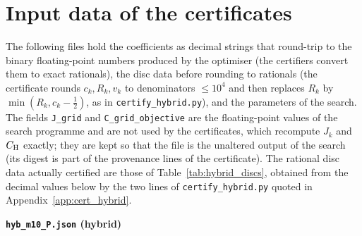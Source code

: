 \documentclass[11pt,reqno]{amsart}
\numberwithin{equation}{section}
\theoremstyle{definition}
\theoremstyle{remark}
\newcommand{\appsub}[1]{\par\medskip\noindent\textbf{#1}\par\nobreak\smallskip}
\begin{document}
\section{Input data of the certificates}\label{app:data}
The following files hold the coefficients as decimal strings that round-trip to the binary floating-point numbers produced by the optimiser (the certifiers convert them to exact rationals), the disc data before rounding to rationals (the certificate rounds $c_k,R_k,v_k$ to denominators $\le10^4$ and then replaces $R_k$ by $\min(R_k,c_k-\frac12)$, as in \texttt{certify\_hybrid.py}), and the parameters of the search. The fields \texttt{J\_grid} and \texttt{C\_grid\_objective} are the floating-point values of the search programme and are not used by the certificates, which recompute $J_k$ and $C_{\rm H}$ exactly; they are kept so that the file is the unaltered output of the search (its digest is part of the provenance lines of the certificate). The rational disc data actually certified are those of Table~\ref{tab:hybrid_discs}, obtained from the decimal values below by the two lines of \texttt{certify\_hybrid.py} quoted in Appendix~\ref{app:cert_hybrid}.
\appsub{\texttt{hyb\_m10\_P.json} (hybrid)}
\end{document}
